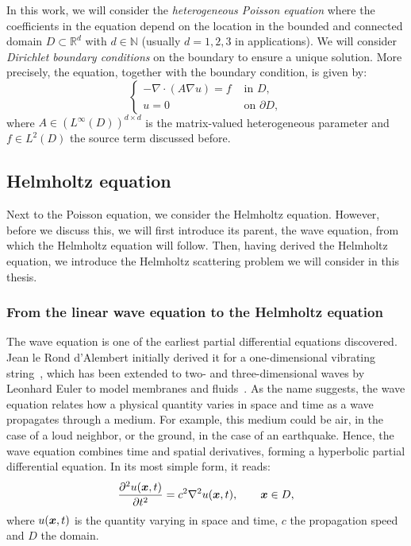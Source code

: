 In this work, we will consider the \emph{heterogeneous Poisson equation} where the coefficients in the equation depend on the location in the bounded and connected domain $D\subset \mathbb{R}^d$ with $d\in\mathbb{N}$ (usually $d=1,2,3$ in applications).
We will consider \emph{Dirichlet boundary conditions} on the boundary to ensure a unique solution.
More precisely, the equation, together with the boundary condition, is given by:
\begin{equation*}
    \begin{cases}
        -\nabla  \cdot \left( A \nabla u \right) = f&\text{ in } D,\\
        u=0 & \text{ on }\partial D,
    \end{cases}
\end{equation*}
where $A \in \left(L^\infty(D)\right)^{d\times d}$ is the matrix-valued heterogeneous parameter and $f\in L^2(D)$ the source term discussed before.

\subsection{Helmholtz equation}\label{subsec:helmholtz-equation}
Next to the Poisson equation, we consider the Helmholtz equation.
However, before we discuss this, we will first introduce its parent, the wave equation, from which the Helmholtz equation will follow.
Then, having derived the Helmholtz equation, we introduce the Helmholtz scattering problem we will consider in this thesis.

\subsubsection{From the linear wave equation to the Helmholtz equation}
The wave equation is one of the earliest partial differential equations discovered.
Jean le Rond d'Alembert initially derived it for a one-dimensional vibrating string~\cite{dalembert1747}, which has been extended to two- and three-dimensional waves by Leonhard Euler to model membranes and fluids~\cite{euler1766}.
As the name suggests, the wave equation relates how a physical quantity varies in space and time as a wave propagates through a medium.
For example, this medium could be air, in the case of a loud neighbor, or the ground, in the case of an earthquake.
Hence, the wave equation combines time and spatial derivatives, forming a hyperbolic partial differential equation.
In its most simple form, it reads:
\begin{equation*}
    \frac{\partial^2 u({{\bm{x}}}, t)}{\partial t^2} = c^2 \nabla^2 u({{\bm{x}}}, t),\qquad {{\bm{x}}}\in D,
\end{equation*}
where $u({{\bm{x}}}, t)$ is the quantity varying in space and time, $c$ the propagation speed and $D$ the domain.

